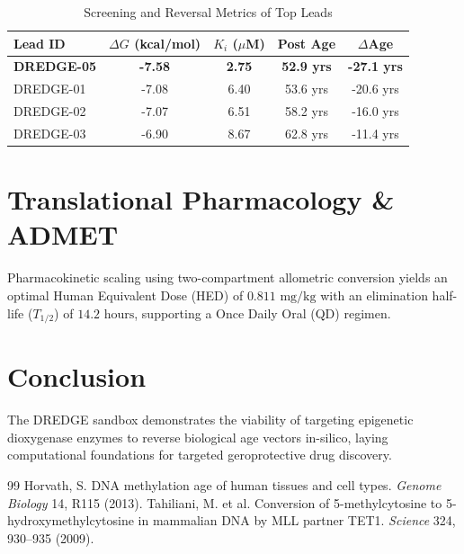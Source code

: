\documentclass[10pt,twocolumn,a4paper]{article}
\begin{document}
\begin{table}[h]
\centering
\small
\caption{Screening and Reversal Metrics of Top Leads}
\label{tab:leads}
\begin{tabular}{lcccc}
\toprule
\textbf{Lead ID} & $\Delta G$ \textbf{(kcal/mol)} & $K_i$ \textbf{($\mu$M)} & \textbf{Post Age} & $\Delta$\textbf{Age} \\
\midrule
\textbf{DREDGE-05} & \textbf{-7.58} & \textbf{2.75} & \textbf{52.9 yrs} & \textbf{-27.1 yrs} \\
DREDGE-01 & -7.08 & 6.40 & 53.6 yrs & -20.6 yrs \\
DREDGE-02 & -7.07 & 6.51 & 58.2 yrs & -16.0 yrs \\
DREDGE-03 & -6.90 & 8.67 & 62.8 yrs & -11.4 yrs \\
\bottomrule
\end{tabular}
\end{table}

\section{Translational Pharmacology \& ADMET}
Pharmacokinetic scaling using two-compartment allometric conversion yields an optimal Human Equivalent Dose (HED) of $0.811\text{ mg/kg}$ with an elimination half-life ($T_{1/2}$) of $14.2\text{ hours}$, supporting a Once Daily Oral (QD) regimen.

\section{Conclusion}
The DREDGE sandbox demonstrates the viability of targeting epigenetic dioxygenase enzymes to reverse biological age vectors in-silico, laying computational foundations for targeted geroprotective drug discovery.

\begin{thebibliography}{99}
 Horvath, S. DNA methylation age of human tissues and cell types. \textit{Genome Biology} 14, R115 (2013).
 Tahiliani, M. et al. Conversion of 5-methylcytosine to 5-hydroxymethylcytosine in mammalian DNA by MLL partner TET1. \textit{Science} 324, 930--935 (2009).
\end{thebibliography}
\end{document}

